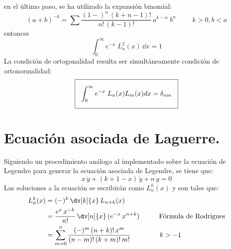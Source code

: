 en el último paso, se ha utilizado la expansión binomial:
\[  (a + b)^{-k} = \sum \dfrac{(1-)^{n} \, (k + n - 1)!}{n! \, (k -1)!} \, a^{k - n} \; b^{n} \hspace{1cm} k >0, b < a \]
entonces
\[ \int_{0}^{\infty} e^{-x} \; L_{n}^{2}(x) \, \dd x = 1 \]
La condición de ortogonalidad resulta ser simultáneamente condición de ortonormalidad:
\begin{equation}
\setlength{\fboxsep}{3\fboxsep}\boxed{\int_{0}^{\infty} e^{-x} \; L_{n}(x) L_{m}(x) d x = \delta_{nm} }
\label{eq:ecuacion_08_78}
\end{equation}
\section{Ecuación asociada de Laguerre.}
Siguiendo un procedimiento análogo al implementado sobre la ecuación de Legendre para generar la ecuación asociada de Legendre, se tiene que:
\[ x \, \ddot{y} + (k + 1 - x) \, \dot{y} +  n \, y = 0 \]
Las soluciones a la ecuación se escribirán como $L_{n}^{k} (x)$ y son tales que:
\begin{align*}
L_{n}^{k} (x) &= (-)^{k} \, \dv[k]{x} \, L_{n+k} (x) \\
&= \dfrac{e^{x} \, x^{-k}}{n!} \, \dv[n]{x} \, (e^{-x} \, x^{n+k}) \hspace{1cm} \mbox{Fórmula de Rodrigues} \\
&= \sum_{m=0}^{n} \dfrac{(-)^{m} \, (n + k)! \, x^{m}}{(n -m )! \, (k + m)! \, m!} \hspace{1.5cm} k > -1
\end{align*}






